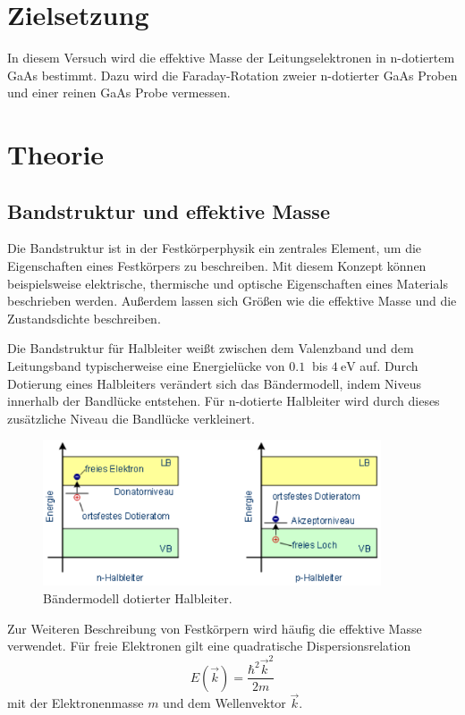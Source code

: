 \section{Zielsetzung}
In diesem Versuch wird die effektive Masse der Leitungselektronen in n-dotiertem GaAs bestimmt.
Dazu wird die Faraday-Rotation zweier n-dotierter GaAs Proben und einer reinen GaAs Probe vermessen.

\section{Theorie}
\subsection{Bandstruktur und effektive Masse}

Die Bandstruktur ist in der Festkörperphysik ein zentrales Element, um die Eigenschaften
eines Festkörpers zu beschreiben. Mit diesem Konzept können beispielsweise elektrische, thermische
und optische Eigenschaften eines Materials beschrieben werden. Außerdem lassen sich Größen wie die
effektive Masse und die Zustandsdichte beschreiben.

Die Bandstruktur für Halbleiter weißt zwischen dem Valenzband und dem Leitungsband typischerweise
eine Energielücke von $\SI{0,1}{}$ bis $\SI{4}{\eV}$ auf. Durch Dotierung eines Halbleiters
verändert sich das Bändermodell, indem Niveus innerhalb der Bandlücke entstehen.
Für n-dotierte Halbleiter wird durch dieses zusätzliche Niveau die Bandlücke verkleinert.

\begin{figure}[H]
  \centering
  \includegraphics[width=10cm]{Bandstruktur.png}
  \caption{Bändermodell dotierter Halbleiter.}
  \label{fig:Band}
\end{figure}

Zur Weiteren Beschreibung von Festkörpern wird häufig die effektive Masse verwendet.
Für freie Elektronen gilt eine quadratische Dispersionsrelation
\begin{equation}
  E(\vec{k})=\frac{\hbar^2 \vec{k}^2}{2m}
\end{equation}
mit der Elektronenmasse $m$ und dem Wellenvektor $\vec{k}$.

